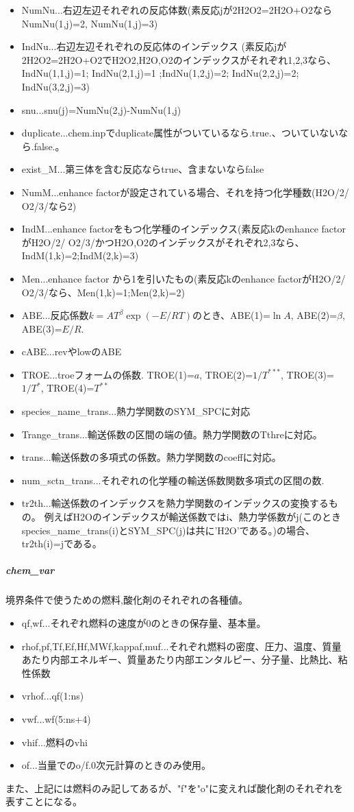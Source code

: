 \documentclass{jsarticle}
\begin{document}
\begin{itemize}
\begin{itemize}
\begin{itemize}
\end{itemize}
\end{itemize}
\item NumNu...右辺左辺それぞれの反応体数(素反応jが2H2O2=2H2O+O2ならNumNu(1,j)=2, NumNu(1,j)=3)
\item IndNu...右辺左辺それぞれの反応体のインデックス
(素反応jが2H2O2=2H2O+O2でH2O2,H2O,O2のインデックスがそれぞれ1,2,3なら、
IndNu(1,1,j)=1; IndNu(2,1,j)=1 ;IndNu(1,2,j)=2; IndNu(2,2,j)=2; IndNu(3,2,j)=3)
\item snu...snu(j)=NumNu(2,j)-NumNu(1,j)
\item duplicate...chem.inpでduplicate属性がついているなら.true.、ついていないなら.false.。
\item exist\_M...第三体を含む反応ならtrue、含まないならfalse
\item NumM...enhance factorが設定されている場合、それを持つ化学種数(H2O/2/ O2/3/なら2)
\item IndM...enhance factorをもつ化学種のインデックス(素反応kのenhance factorがH2O/2/ O2/3/かつH2O,O2のインデックスがそれぞれ2,3なら、IndM(1,k)=2;IndM(2,k)=3)
\item Men...enhance factor から1を引いたもの(素反応kのenhance factorがH2O/2/ O2/3/なら、Men(1,k)=1;Men(2,k)=2)
\item ABE...反応係数$k=AT^\beta \exp(-E/RT)$のとき、ABE(1)=$\ln A$, ABE(2)=$\beta$, ABE(3)=$E/R$.
\item cABE...revやlowのABE
\item TROE...troeフォームの係数. 
TROE(1)=$a$, TROE(2)=$1/T^{***}$, TROE(3)=$1/T^{*}$, TROE(4)=$T^{**}$
\item species\_name\_trans...熱力学関数のSYM\_SPCに対応
\item Trange\_trans...輸送係数の区間の端の値。熱力学関数のTthreに対応。
\item trans...輸送係数の多項式の係数。熱力学関数のcoeffに対応。
\item num\_sctn\_trans...それぞれの化学種の輸送係数関数多項式の区間の数.
\item tr2th...輸送係数のインデックスを熱力学関数のインデックスの変換するもの。
例えばH2Oのインデックスが輸送係数ではi、熱力学係数がj(このときspecies\_name\_trans(i)とSYM\_SPC(j)は共に'H2O'である。)の場合、
tr2th(i)=jである。
\end{itemize}

\subparagraph{chem\_var}境界条件で使うための燃料,酸化剤のそれぞれの各種値。
\begin{itemize}
\item qf,wf...それぞれ燃料の速度が0のときの保存量、基本量。
\item rhof,pf,Tf,Ef,Hf,MWf,kappaf,muf...それぞれ燃料の密度、圧力、温度、質量あたり内部エネルギー、質量あたり内部エンタルピー、分子量、比熱比、粘性係数
\item vrhof...qf(1:ns)
\item vwf...wf(5:ns+4)
\item vhif...燃料のvhi
\item of...当量でのo/f.0次元計算のときのみ使用。
\end{itemize}
また、上記には燃料のみ記してあるが、"f"を"o"に変えれば酸化剤のそれぞれを表すことになる。
\end{document}
